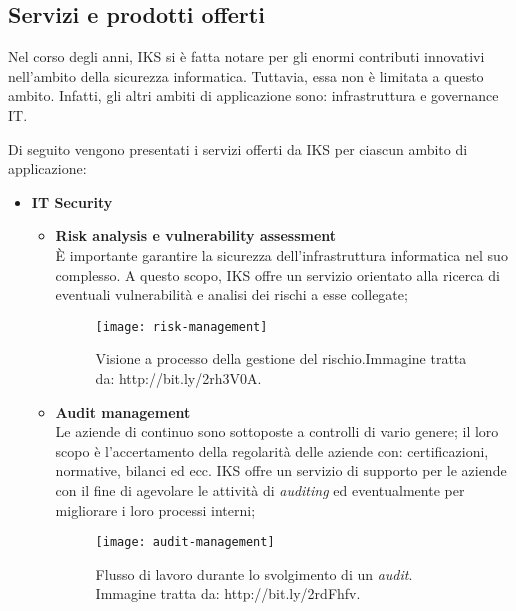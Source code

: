 \subsection{Servizi e prodotti offerti}

Nel corso degli anni, IKS si è fatta notare per gli enormi contributi 
innovativi nell'ambito della sicurezza informatica. Tuttavia, essa non 
è limitata a questo ambito. Infatti, gli altri ambiti di applicazione 
sono: infrastruttura e governance IT. 

Di seguito vengono presentati i servizi offerti da IKS per ciascun ambito di 
applicazione:

\begin{itemize}
	\item \textbf{IT Security}\\
	 \begin{itemize}
	 	\item \textbf{Risk analysis e vulnerability assessment}\\ 
	 	È importante garantire la sicurezza dell'infrastruttura 
		informatica nel suo complesso. A questo scopo, IKS offre un 
		servizio orientato alla ricerca di eventuali vulnerabilità e 
		analisi dei rischi a esse collegate;
	 
	 	\begin{figure}[htbp]
	 		\begin{center}
	 			\texttt{[image: risk-management]}
	 			\caption{Visione a processo della gestione del 
				 rischio.Immagine tratta da: http://bit.ly/2rh3V0A.}
	 		\end{center}
	 	\end{figure}
	 		 	
		\item \textbf{Audit management}\\
		Le aziende di continuo sono sottoposte a controlli di vario 
		genere; il loro scopo è l'accertamento della 
		regolarità delle aziende con: certificazioni, normative, bilanci 
		ed ecc. IKS offre un servizio di supporto per le aziende con 
		il fine di agevolare le attività di \emph{auditing} 
		ed eventualmente per migliorare i loro processi interni;
		\begin{figure}[htbp]
			\begin{center}
				\hspace{3em}
				\texttt{[image: audit-management]}
				\caption{Flusso di lavoro durante lo 
				svolgimento di un \emph{audit}.
				Immagine tratta da: http://bit.ly/2rdFhfv.}
			\end{center}
		\end{figure}
	

\end{itemize}
\end{itemize}
